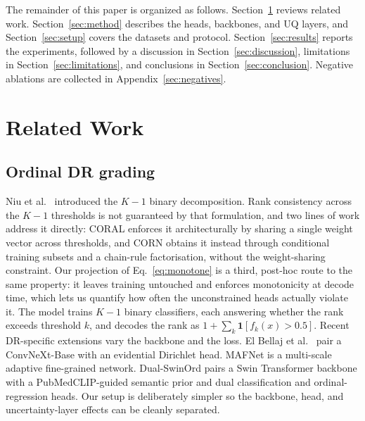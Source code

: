 \documentclass[journal]{IEEEtran}
\begin{document}
The remainder of this paper is organized as follows. Section~\ref{sec:related} reviews related work. Section~\ref{sec:method} describes the heads, backbones, and UQ layers, and Section~\ref{sec:setup} covers the datasets and protocol. Section~\ref{sec:results} reports the experiments, followed by a discussion in Section~\ref{sec:discussion}, limitations in Section~\ref{sec:limitations}, and conclusions in Section~\ref{sec:conclusion}. Negative ablations are collected in Appendix~\ref{sec:negatives}.

\section{Related Work}
\label{sec:related}

\subsection{Ordinal DR grading}
Niu et al.\ \cite{ref:niu} introduced the $K{-}1$ binary decomposition. Rank consistency across the $K{-}1$ thresholds is not guaranteed by that formulation, and two lines of work address it directly: CORAL \cite{ref:coral} enforces it architecturally by sharing a single weight vector across thresholds, and CORN \cite{ref:corn} obtains it instead through conditional training subsets and a chain-rule factorisation, without the weight-sharing constraint. Our projection of Eq.~\eqref{eq:monotone} is a third, post-hoc route to the same property: it leaves training untouched and enforces monotonicity at decode time, which lets us quantify how often the unconstrained heads actually violate it. The model trains $K{-}1$ binary classifiers, each answering whether the rank exceeds threshold $k$, and decodes the rank as $1 + \sum_k \mathbf{1}[f_k(x){>}0.5]$. Recent DR-specific extensions vary the backbone and the loss. El Bellaj et al.\ \cite{ref:uaorlqap} pair a ConvNeXt-Base with an evidential Dirichlet head. MAFNet \cite{ref:mafnet} is a multi-scale adaptive fine-grained network. Dual-SwinOrd \cite{ref:dualswinord} pairs a Swin Transformer backbone with a PubMedCLIP-guided semantic prior and dual classification and ordinal-regression heads. Our setup is deliberately simpler so the backbone, head, and uncertainty-layer effects can be cleanly separated.
\end{document}
